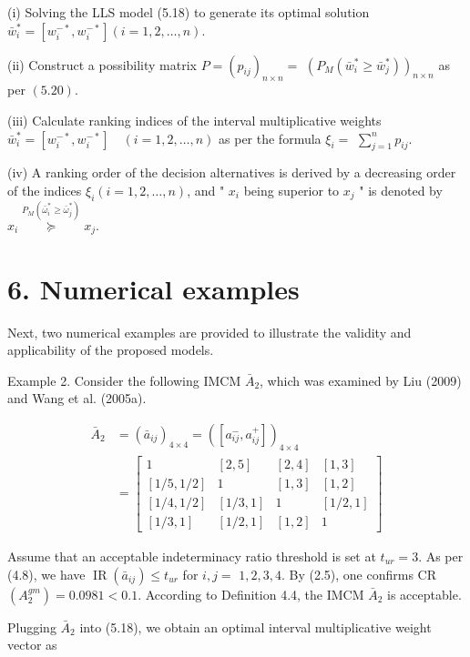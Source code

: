\documentclass[10pt]{article}
\begin{document}
(i) Solving the LLS model (5.18) to generate its optimal solution $\bar{w}_{i}^{*}=\left[w_{i}^{-*}, w_{i}^{-*}\right](i=1,2, \ldots, n)$.

(ii) Construct a possibility matrix $P=\left(p_{i j}\right)_{n \times n}=$ $\left(P_{M}\left(\bar{w}_{i}^{*} \geq \bar{w}_{j}^{*}\right)\right)_{n \times n}$ as per $(5.20)$.

(iii) Calculate ranking indices of the interval multiplicative weights $\bar{w}_{i}^{*}=\left[w_{i}^{-*}, w_{i}^{-*}\right] \quad(i=1,2, \ldots, n)$ as per the formula $\xi_{i}=$ $\sum_{j=1}^{n} p_{i j}$.

(iv) A ranking order of the decision alternatives is derived by a decreasing order of the indices $\xi_{i}(i=1,2, \ldots, n)$, and " $x_{i}$ being superior to $x_{j}$ " is denoted by $x_{i} \stackrel{P_{M}\left(\bar{\omega}_{i}^{*} \geq \bar{\omega}_{j}^{*}\right)}{\succeq} x_{j}$.

\section*{6. Numerical examples}
Next, two numerical examples are provided to illustrate the validity and applicability of the proposed models.

Example 2. Consider the following IMCM $\bar{A}_{2}$, which was examined by Liu (2009) and Wang et al. (2005a).

$$
\begin{aligned}
\bar{A}_{2} & =\left(\bar{a}_{i j}\right)_{4 \times 4}=\left(\left[a_{i j}^{-}, a_{i j}^{+}\right]\right)_{4 \times 4} \\
& =\left[\begin{array}{cccc}
1 & {[2,5]} & {[2,4]} & {[1,3]} \\
{[1 / 5,1 / 2]} & 1 & {[1,3]} & {[1,2]} \\
{[1 / 4,1 / 2]} & {[1 / 3,1]} & 1 & {[1 / 2,1]} \\
{[1 / 3,1]} & {[1 / 2,1]} & {[1,2]} & 1
\end{array}\right]
\end{aligned}
$$

Assume that an acceptable indeterminacy ratio threshold is set at $t_{u r}=3$. As per (4.8), we have $\operatorname{IR}\left(\bar{a}_{i j}\right) \leq t_{u r}$ for $i, j=$ $1,2,3,4$. By (2.5), one confirms CR $\left(A_{2}^{g m}\right)=0.0981<0.1$. According to Definition 4.4, the IMCM $\bar{A}_{2}$ is acceptable.

Plugging $\bar{A}_{2}$ into (5.18), we obtain an optimal interval multiplicative weight vector as
\end{document}
